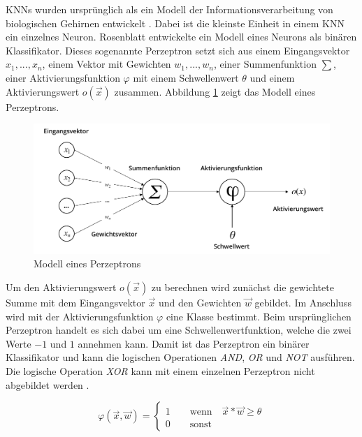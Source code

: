 \acp{KNN} wurden ursprünglich als ein Modell der Informationsverarbeitung von biologischen Gehirnen entwickelt \cite{mcculloch1943logical}. Dabei ist die kleinste Einheit in einem \ac{KNN} ein einzelnes Neuron. Rosenblatt \cite{rosenblatt1958perceptron} entwickelte ein Modell eines Neurons als binären Klassifikator. Dieses sogenannte Perzeptron setzt sich aus einem Eingangsvektor $x_1, ..., x_n$, einem Vektor mit Gewichten $w_1, ..., w_n$, einer Summenfunktion $\sum$, einer Aktivierungsfunktion $\varphi$ mit einem Schwellenwert $\theta$ und einem Aktivierungswert $o(\vec{x})$ zusammen. Abbildung \ref{fig_perceptron} zeigt das Modell eines Perzeptrons.

\begin{figure}[h]
\centering
\includegraphics[scale=0.7]{images/perceptron.pdf}
\caption[Modell eines Perzeptrons]{Modell eines Perzeptrons \cite{rosenblatt1958perceptron}}
\label{fig_perceptron}
\end{figure}

Um den Aktivierungswert $o(\vec{x})$ zu berechnen wird zunächst die gewichtete Summe mit dem Eingangsvektor $\vec{x}$ und den Gewichten $\vec{w}$ gebildet. Im Anschluss wird mit der Aktivierungsfunktion $\varphi$ eine Klasse bestimmt. Beim ursprünglichen Perzeptron handelt es sich dabei um eine Schwellenwertfunktion, welche die zwei Werte $-1$ und $1$ annehmen kann. Damit ist das Perzeptron ein binärer Klassifikator und kann die logischen Operationen \textit{AND}, \textit{OR} und \textit{NOT} ausführen. Die logische Operation \textit{XOR} kann mit einem einzelnen Perzeptron nicht abgebildet werden \cite{minski1969perceptrons}.

\begin{equation}
\varphi(\vec{x}, \vec{w}) = \begin{cases} 1 \qquad \text{wenn} \quad \vec{x}*\vec{w} \geq \theta \\ 0 \qquad \text{sonst} \end{cases}
\end{equation}

